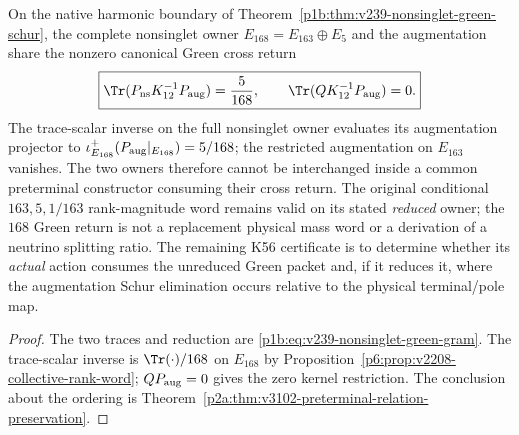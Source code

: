 \documentclass[12pt,a4paper]{article}
\begin{document}
\begin{corollary}
\label{p6:cor:v239-neutral-green-port-test}
On the native harmonic boundary of
Theorem~\ref{p1b:thm:v239-nonsinglet-green-schur}, the complete
nonsinglet owner $E_{168}=E_{163}\oplus E_5$ and the augmentation
share the nonzero canonical Green cross return
\[
 \boxed{\Tr(P_{\rm ns}K_{12}^{-1}P_{\rm aug})=\frac5{168},
 \qquad \Tr(QK_{12}^{-1}P_{\rm aug})=0.}
\]
The trace-scalar inverse on the full nonsinglet owner evaluates its
augmentation projector to
$\iota_{E_{168}}^+(P_{\rm aug}|_{E_{168}})=5/168$;
the restricted augmentation on $E_{163}$ vanishes. The two owners
therefore cannot be interchanged inside a common preterminal
constructor consuming their cross return. The original conditional
$163,5,1/163$ rank-magnitude word remains valid on its stated
\emph{reduced} owner; the $168$ Green return is not a replacement
physical mass word or a derivation of a neutrino splitting ratio.
The remaining K56 certificate is to determine whether its \emph{actual}
action consumes the unreduced Green packet and, if it reduces it,
where the augmentation Schur elimination occurs relative to the
physical terminal/pole map.
\end{corollary}
\begin{proof}
The two traces and reduction are
\eqref{p1b:eq:v239-nonsinglet-green-gram}. The trace-scalar inverse
is $\Tr(\cdot)/168$ on $E_{168}$ by
Proposition~\ref{p6:prop:v2208-collective-rank-word};
$Q P_{\rm aug}=0$ gives the zero kernel restriction.
The conclusion about the ordering is
Theorem~\ref{p2a:thm:v3102-preterminal-relation-preservation}.
\end{proof}
\end{document}
